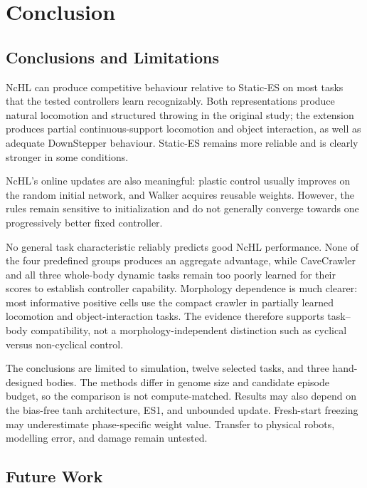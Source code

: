 \chapter{Conclusion}
\label{cha:discussion}

\section{Conclusions and Limitations}
\label{sec:discussion-conclusion}

NcHL can produce competitive behaviour relative to Static-ES on most tasks that the tested controllers learn recognizably. Both representations produce natural locomotion and structured throwing in the original study; the extension produces partial continuous-support locomotion and object interaction, as well as adequate DownStepper behaviour. Static-ES remains more reliable and is clearly stronger in some conditions.

NcHL's online updates are also meaningful: plastic control usually improves on the random initial network, and Walker acquires reusable weights. However, the rules remain sensitive to initialization and do not generally converge towards one progressively better fixed controller. 

No general task characteristic reliably predicts good NcHL performance. None of the four predefined groups produces an aggregate advantage, while CaveCrawler and all three whole-body dynamic tasks remain too poorly learned for their scores to establish controller capability. Morphology dependence is much clearer: most informative positive cells use the compact crawler in partially learned locomotion and object-interaction tasks. The evidence therefore supports task--body compatibility, not a morphology-independent distinction such as cyclical versus non-cyclical control.

The conclusions are limited to simulation, twelve selected tasks, and three hand-designed bodies. The methods differ in genome size and candidate episode budget, so the comparison is not compute-matched. Results may also depend on the bias-free tanh architecture, ES1, and unbounded update. Fresh-start freezing may underestimate phase-specific weight value. Transfer to physical robots, modelling error, and damage remain untested.

\section{Future Work}
\label{sec:discussion-future}

